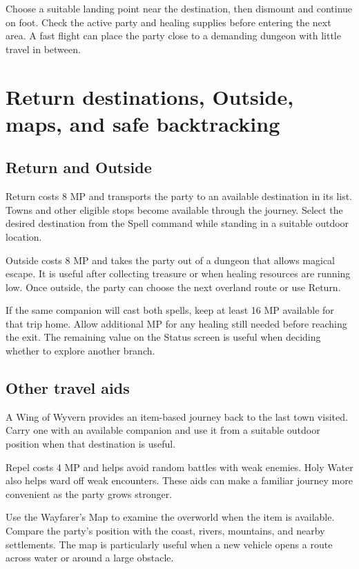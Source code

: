 Choose a suitable landing point near the destination, then dismount and
continue on foot. Check the active party and healing supplies before
entering the next area. A fast flight can place the party close to a
demanding dungeon with little travel in between.

\section{Return destinations, Outside, maps, and safe backtracking}

\subsection*{Return and Outside}

Return costs 8 MP and transports the party to an available destination
in its list. Towns and other eligible stops become available through the
journey. Select the desired destination from the Spell command while
standing in a suitable outdoor location.

Outside costs 8 MP and takes the party out of a dungeon that allows
magical escape. It is useful after collecting treasure or when healing
resources are running low. Once outside, the party can choose the next
overland route or use Return.

If the same companion will cast both spells, keep at least 16 MP available
for that trip home. Allow additional MP for any healing still needed before
reaching the exit. The remaining value on the Status screen is useful
when deciding whether to explore another branch.

\subsection*{Other travel aids}

A Wing of Wyvern provides an item-based journey back to the last town
visited. Carry one with an available companion and use it from a suitable
outdoor position when that destination is useful.

Repel costs 4 MP and helps avoid random battles with weak enemies. Holy
Water also helps ward off weak encounters. These aids can make a familiar
journey more convenient as the party grows stronger.

Use the Wayfarer's Map to examine the overworld when the item is available.
Compare the party's position with the coast, rivers, mountains, and nearby
settlements. The map is particularly useful when a new vehicle opens a
route across water or around a large obstacle.

